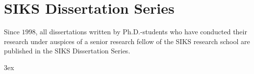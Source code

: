 \chapter{SIKS Dissertation Series}

Since $1998$, all dissertations written by Ph.D.-students who have conducted
their research under auspices of a senior research fellow of the SIKS research
school are published in the SIKS Dissertation Series. 

\begin{multicols}{2}{
\begin{scriptsize} \begin{flushleft}
\hangindent 3ex



\end{flushleft}
\end{scriptsize}
\vfill
}
\end{multicols}
